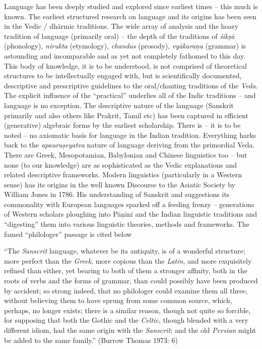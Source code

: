 Language has been deeply studied and explored since earliest times – this much is known. The earliest structured research on language and its origins has been seen in the Vedic / dhārmic traditions. The wide array of analysis and the hoary tradition of language (primarily oral) – the depth of the traditions of \textit{śikṣā} (phonology), \textit{nirukta} (etymology), \textit{chandas} (prosody), \textit{vyākaraņa} (grammar) is astounding and incomparable and as yet not completely fathomed to this day. This body of knowledge, it is to be understood, is not comprised of theoretical structures to be intellectually engaged with, but is scientifically documented, descriptive and prescriptive guidelines to the oral/chanting traditions of the \textit{Veda}. The explicit influence of the “practical” underlies all of the Indic traditions – and language is no exception. The descriptive nature of the language (Sanskrit primarily and also others like Prakrit, Tamil etc) has been captured in efficient (generative) algebraic forms by the earliest scholarship. There is – it is to be noted – no axiomatic basis for language in the Indian tradition. Everything harks back to the \textit{apauruṣeyatva} nature of language deriving from the primordial Veda. There are Greek, Mesopotamian, Babylonian and Chinese linguistics too – but none (to our knowledge) are as sophisticated as the Vedic explanations and related descriptive frameworks. Modern linguistics (particularly in a Western sense) has its origins in the well known Discourse to the Asiatic Society by William Jones in 1786. His understanding of Sanskrit and suggestions its commonality with European languages sparked off a feeding frenzy – generations of Western scholars ploughing into Pāņini and the Indian linguistic traditions and “digesting” them into various linguistic theories, methods and frameworks. The famed “philologer” passage is cited below

\vskip 2pt

\begin{myquote}
“The \textit{Sanscrit} language, whatever be its antiquity, is of a wonderful structure; more perfect than the \textit{Greek}, more copious than the \textit{Latin}, and more exquisitely refined than either, yet bearing to both of them a stronger affinity, both in the roots of verbs and the forms of grammar, than could possibly have been produced by accident; so strong indeed, that no philologer could examine them all three, without believing them to have sprung from some common source, which, perhaps, no longer exists; there is a similar reason, though not quite so forcible, for supposing that both the Gothic and the \textit{Celtic}, though blended with a very different idiom, had the same origin with the \textit{Sanscrit}; and the old \textit{Persian} might be added to the same family.” (Burrow Thomas 1973: 6)
\end{myquote}

